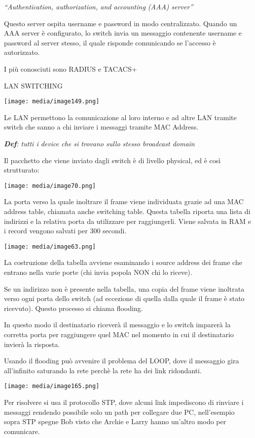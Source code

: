 \emph{``Authentication, authorization, and accounting (AAA) server''}

Questo server ospita username e password in modo centralizzato. Quando
un AAA server è configurato, lo switch invia un messaggio contenente
username e password al server stesso, il quale risponde comunicando se
l'accesso è autorizzato.

I più conosciuti sono RADIUS e TACACS+

LAN SWITCHING

\texttt{[image: media/image149.png]}

Le LAN permettono la comunicazione al loro interno e ad altre LAN
tramite switch che sanno a chi inviare i messaggi tramite MAC Address.

\emph{\textbf{Def}: tutti i device che si trovano sullo stesso broadcast
domain}

Il pacchetto che viene inviato dagli switch è di livello physical, ed è
così strutturato:

\texttt{[image: media/image70.png]}

La porta verso la quale inoltrare il frame viene individuata grazie ad
una MAC address table, chiamata anche switching table. Questa tabella
riporta una lista di indirizzi e la relativa porta da utilizzare per
raggiungerli. Viene salvata in RAM e i record vengono salvati per 300
secondi.

\texttt{[image: media/image63.png]}

La costruzione della tabella avviene esaminando i source address dei
frame che entrano nella varie porte (chi invia popola NON chi lo
riceve).

Se un indirizzo non è presente nella tabella, una copia del frame viene
inoltrata verso ogni porta dello switch (ad eccezione di quella dalla
quale il frame è stato ricevuto). Questo processo si chiama flooding.

In questo modo il destinatario riceverà il messaggio e lo switch
imparerà la corretta porta per raggiungere quel MAC nel momento in cui
il destinatario invierà la risposta.

Usando il flooding può avvenire il problema del LOOP, dove il messaggio
gira all'infinito saturando la rete perchè la rete ha dei link
ridondanti.

\texttt{[image: media/image165.png]}

Per risolvere si usa il protocollo STP, dove alcuni link impediscono di
rinviare i messaggi rendendo possibile solo un path per collegare due
PC, nell'esempio sopra STP spegne Bob visto che Archie e Larry hanno
un'altro modo per comunicare.

